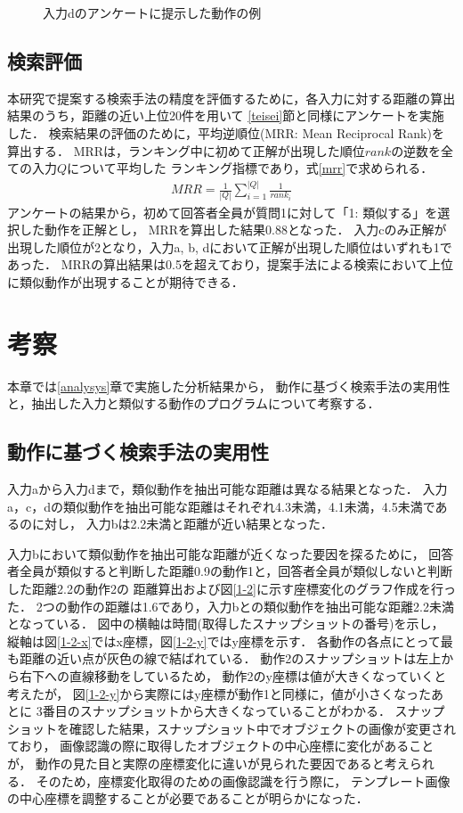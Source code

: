 \documentclass[11pt]{jreport}
\begin{document}
\begin{figure}[H]
\begin{tabular}{cc}
      \end{tabular}
    \caption{入力dのアンケートに提示した動作の例}
    \label{inputd-ex}
\end{figure}

\section{検索評価} 
\label{ranking}     
本研究で提案する検索手法の精度を評価するために，各入力に対する距離の算出結果のうち，距離の近い上位20件を用いて
\ref{teisei}節と同様にアンケートを実施した．
検索結果の評価のために，平均逆順位(MRR: Mean Reciprocal Rank)を算出する．
MRRは，ランキング中に初めて正解が出現した順位$rank$の逆数を全ての入力$Q$について平均した
ランキング指標であり，式\ref{mrr}で求められる．
\begin{eqnarray}
    \label{mrr}
    MRR = \frac{1}{|Q|}\sum_{i=1}^{|Q|}\frac{1}{rank_i}
\end{eqnarray}
アンケートの結果から，初めて回答者全員が質問1に対して「1: 類似する」を選択した動作を正解とし，
MRRを算出した結果0.88となった．
入力cのみ正解が出現した順位が2となり，入力a, b, dにおいて正解が出現した順位はいずれも1であった．
MRRの算出結果は0.5を超えており，提案手法による検索において上位に類似動作が出現することが期待できる．

\chapter{考察}
本章では\ref{analysys}章で実施した分析結果から，
動作に基づく検索手法の実用性と，抽出した入力と類似する動作のプログラムについて考察する．

\section{動作に基づく検索手法の実用性}

入力aから入力dまで，類似動作を抽出可能な距離は異なる結果となった．
入力a，c，dの類似動作を抽出可能な距離はそれぞれ4.3未満，4.1未満，4.5未満であるのに対し，
入力bは2.2未満と距離が近い結果となった．

入力bにおいて類似動作を抽出可能な距離が近くなった要因を探るために，
回答者全員が類似すると判断した距離0.9の動作1と，回答者全員が類似しないと判断した距離2.2の動作2の
距離算出および図\ref{1-2}に示す座標変化のグラフ作成を行った．
2つの動作の距離は1.6であり，入力bとの類似動作を抽出可能な距離2.2未満となっている．
図中の横軸は時間(取得したスナップショットの番号)を示し，
縦軸は図\ref{1-2-x}ではx座標，図\ref{1-2-y}ではy座標を示す．
各動作の各点にとって最も距離の近い点が灰色の線で結ばれている．
動作2のスナップショットは左上から右下への直線移動をしているため，
動作2のy座標は値が大きくなっていくと考えたが，
図\ref{1-2-y}から実際にはy座標が動作1と同様に，値が小さくなったあとに
3番目のスナップショットから大きくなっていることがわかる．
スナップショットを確認した結果，スナップショット中でオブジェクトの画像が変更されており，
画像認識の際に取得したオブジェクトの中心座標に変化があることが，
動作の見た目と実際の座標変化に違いが見られた要因であると考えられる．
そのため，座標変化取得のための画像認識を行う際に，
テンプレート画像の中心座標を調整することが必要であることが明らかになった．
\end{document}
